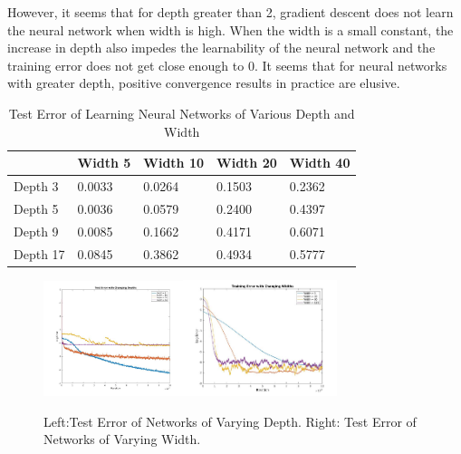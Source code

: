 However, it seems that for depth greater than 2, gradient descent does not learn the neural network when width is high. When the width is a small constant, the increase in depth also impedes the learnability of the neural network and the training error does not get close enough to 0. It seems that for neural networks with greater depth, positive convergence results in practice are elusive.
\begin{table}[tb]
\caption{Test Error of Learning Neural Networks of Various Depth and Width}
\vskip 0.1in
\begin{center}
\begin{small}
\begin{sc}
\begin{tabular}{
  |p{}|%
  |p{}%
  |p{}%
  |p{}%
   |p{}|%
  }
   \hline 
           & Width 5   &  Width 10   & Width 20 & Width 40     \\ \hline 
    Depth 3 & 0.0033   & 0.0264        &   0.1503 & 0.2362 \\ \hline
    Depth 5 & 0.0036   & 0.0579        &   0.2400 & 0.4397 \\ \hline
    Depth 9 & 0.0085   & 0.1662        &   0.4171 & 0.6071 \\ \hline
    Depth 17 & 0.0845   & 0.3862        &   0.4934 & 0.5777 \\ \hline
\end{tabular}
\end{sc}
\end{small}
\end{center}
\vskip -0.1in
\end{table}
\begin{figure}[tb]
\vskip 0.1in
\begin{center}
\includegraphics[width = 1.6in]{plotChangeDepth.jpg}\includegraphics[width = 1.77in]{plotChangeWidth.jpg}
\caption{Left:Test Error of Networks of Varying Depth. Right: Test Error of Networks of Varying Width.}
\end{center}
\vskip -0.1in
\end{figure}
